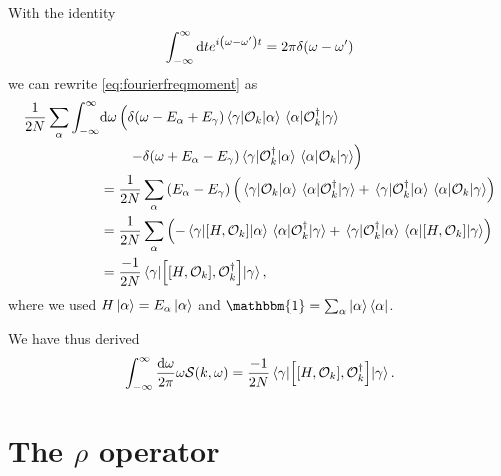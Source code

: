 \documentclass[11pt, a4paper]{report} %
\begin{document}
With the identity
\begin{equation}
  \int_{-\infty}^{\infty} \dd t e^{i\qty(\omega-\omega')t} = 2\pi \delta(\omega-\omega')
\end{equation}
we can rewrite \cref{eq:fourierfreqmoment} as 
\begin{align}
  \frac{1}{2N} \sum_{\alpha} \int_{-\infty}^{\infty}&\dd \omega  \left(\delta\qty(\omega-E_{\alpha}+E_{\gamma})\matrixel{\gamma}{\mathcal{O}_k}{\alpha}\matrixel{\alpha}{\mathcal{O}_{k}^{\dagger}}{\gamma}\right. \nonumber\\
&\qquad\left.- \delta\qty(\omega+E_{\alpha}-E_{\gamma})\matrixel{\gamma}{\mathcal{O}_{k}^{\dagger}}{\alpha}\matrixel{\alpha}{\mathcal{O}_k}{\gamma}\right)\\
&=\frac{1}{2N} \sum_{\alpha} \qty(E_{\alpha} - E_{\gamma}) \left(\matrixel{\gamma}{\mathcal{O}_k}{\alpha}\matrixel{\alpha}{\mathcal{O}_{k}^{\dagger}}{\gamma} + \matrixel{\gamma}{\mathcal{O}_{k}^{\dagger}}{\alpha}\matrixel{\alpha}{\mathcal{O}_k}{\gamma}\right)\\
&=\frac{1}{2N} \sum_{\alpha}  \left(-\matrixel{\gamma}{[H,\mathcal{O}_k]}{\alpha}\matrixel{\alpha}{\mathcal{O}_{k}^{\dagger}}{\gamma} + \matrixel{\gamma}{\mathcal{O}_{k}^{\dagger}}{\alpha}\matrixel{\alpha}{\qty[H,\mathcal{O}_k]}{\gamma}\right)\\
&=\frac{-1}{2N} \matrixel{\gamma}{\qty[\qty[H,\mathcal{O}_k],\mathcal{O}_{k}^{\dagger}]}{\gamma},
\end{align}
where we used \(H\ket{\alpha}=E_{\alpha}\ket{\alpha}\) and \(\mathbbm{1}=\sum_{\alpha}\ket{\alpha}\bra{\alpha}\).

We have thus derived~\cite{Cauxfsum}
\begin{align}
\label{eq:generalfsum}
  \int_{-\infty}^{\infty}\frac{\dd \omega}{2\pi} \omega \mathcal{S}(k,\omega) = \frac{-1}{2N} \matrixel{\gamma}{\qty[\qty[H,\mathcal{O}_k],\mathcal{O}_{k}^{\dagger}]}{\gamma}.
\end{align}


\section{The $\rho$ operator}
\end{document}
